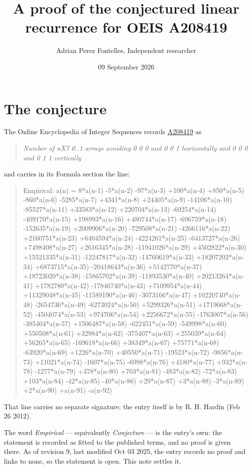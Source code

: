 \documentclass[11pt]{article}
\title{A proof of the conjectured linear recurrence for OEIS A208419}
\author{Adrian Perez Fontelles, Independent researcher}
\date{09 September 2026}
\theoremstyle{definition}
\begin{document}
\maketitle
\section{The conjecture}

The Online Encyclopedia of Integer Sequences records \href{https://oeis.org/A208419}{A208419} as

\begin{quote}\itshape Number of nX7 0..1 arrays avoiding 0 0 0 and 0 0 1 horizontally and 0 0 0 and 0 1 1 vertically\end{quote}

and carries in its Formula section the line:

\begin{quote}\ttfamily Empirical: a(n) = 8*a(n-1) -5*a(n-2) -97*a(n-3) +100*a(n-4) +850*a(n-5) -860*a(n-6) -5285*a(n-7) +4341*a(n-8) +24405*a(n-9) -14106*a(n-10) -85527*a(n-11) +33583*a(n-12) +220704*a(n-13) -69254*a(n-14) -409170*a(n-15) +198993*a(n-16) +480744*a(n-17) -696759*a(n-18) -152635*a(n-19) +2009906*a(n-20) -729508*a(n-21) -4266116*a(n-22) +2160751*a(n-23) +6404594*a(n-24) -4224261*a(n-25) -6413727*a(n-26) +7498408*a(n-27) +2616345*a(n-28) -11941026*a(n-29) +4502822*a(n-30) +15521335*a(n-31) -12247817*a(n-32) -14760619*a(n-33) +18207202*a(n-34) +6873715*a(n-35) -20418643*a(n-36) +5142770*a(n-37) +18723020*a(n-38) -15865702*a(n-39) -11893530*a(n-40) +20213264*a(n-41) +1782780*a(n-42) -17846740*a(n-43) +7109954*a(n-44) +11329048*a(n-45) -11589190*a(n-46) -3073166*a(n-47) +10220740*a(n-48) -2654736*a(n-49) -6273024*a(n-50) +5299326*a(n-51) +1719668*a(n-52) -4504074*a(n-53) +974706*a(n-54) +2256672*a(n-55) -1763007*a(n-56) -385404*a(n-57) +1506487*a(n-58) -622451*a(n-59) -549998*a(n-60) +550508*a(n-61) +32984*a(n-62) -375407*a(n-63) +255039*a(n-64) +56265*a(n-65) -169618*a(n-66) +38349*a(n-67) +75771*a(n-68) -63920*a(n-69) +1226*a(n-70) +40550*a(n-71) -19523*a(n-72) -9856*a(n-73) +11021*a(n-74) -1607*a(n-75) -6998*a(n-76) +4180*a(n-77) +932*a(n-78) -1277*a(n-79) +378*a(n-80) +703*a(n-81) -483*a(n-82) -72*a(n-83) +103*a(n-84) -42*a(n-85) -40*a(n-86) +29*a(n-87) +3*a(n-88) -3*a(n-89) +2*a(n-90) +a(n-91) -a(n-92)\end{quote}

That line carries no separate signature; the entry itself is by R. H. Hardin (Feb 26 2012).

The word {\itshape Empirical} --- equivalently {\itshape Conjecture} --- is the entry's own: the statement is recorded as fitted to the published terms, and no proof is given there. As of revision 9, last modified Oct 03 2025, the entry records no proof and links to none, so the statement is open. This note settles it.
\end{document}
